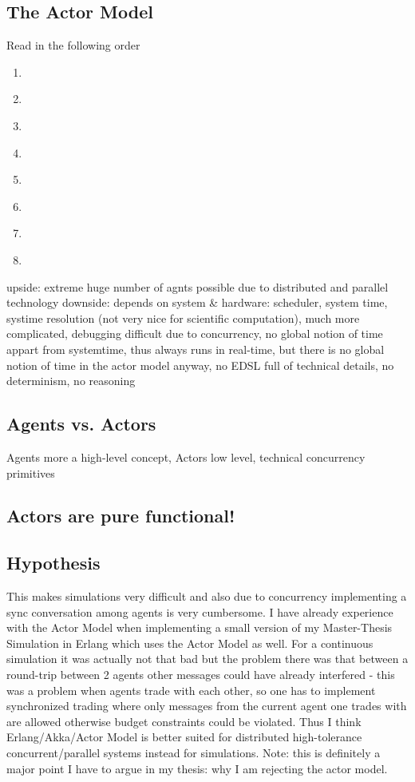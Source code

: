\documentclass{article}
\begin{document}
\subsection{The Actor Model}
Read in the following order


\begin{enumerate}
\item \cite{Hewitt_1973}
\item \cite{Greif_1975}
\item \cite{Clinger_1981}
\item \cite{Agha_1986}
\item \cite{Agha_1997}
\item \cite{Hewitt_2007}
\item \cite{Hewitt_2010}
\item \cite{Agha_2004}
\end{enumerate}

upside: extreme huge number of agnts possible due to distributed and parallel technology 
downside: depends on system \& hardware: scheduler, system time, systime resolution (not very nice for scientific computation), much more complicated, debugging difficult due to concurrency, no global notion of time appart from systemtime, thus always runs in real-time, but there is no global notion of time in the actor model anyway, no EDSL full of technical details, no determinism, no reasoning

\subsection{Agents vs. Actors}
Agents more a high-level concept, Actors low level, technical concurrency primitives

\subsection{Actors are pure functional!}

\subsection{Hypothesis}
This makes simulations very difficult and also due to concurrency implementing a sync conversation among agents is very cumbersome. I have already experience with the Actor Model when implementing a small version of my Master-Thesis Simulation in Erlang which uses the Actor Model as well. For a continuous simulation it was actually not that bad but the problem there was that between a round-trip between 2 agents other messages could have already interfered - this was a problem when agents trade with each other, so one has to implement synchronized trading where only messages from the current agent one trades with are allowed otherwise budget constraints could be violated. Thus I think Erlang/Akka/Actor Model is better suited for distributed high-tolerance concurrent/parallel systems instead for simulations. Note: this is definitely a major point I have to argue in my thesis: why I am rejecting the actor model.
\end{document}
